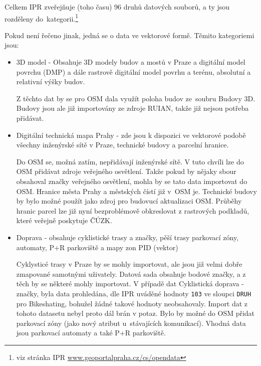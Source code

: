 Celkem IPR zveřejňuje (toho času) 96 druhů datových souborů, a ty jsou rozděleny
do~kategorii.\footnote{viz stránka IPR \url{www.geoportalpraha.cz/cs/opendata}}

Pokud není řečeno jinak, jedná se o data ve vektorové formě.
Těmito kategoriemi jsou:

\begin{itemize}
    \item   3D model - Obsahuje 3D modely budov a mostů v Praze a digitální
            model povrchu (DMP) a dále rastrově digitální model povrhu a
            terénu, absolutní a relativní výšky budov.

            Z těchto dat by se pro OSM dala využít poloha budov ze~soubru
            Budovy 3D. Budovy jsou ale již importovány ze zdroje RUIAN, takže
            již nejsou potřeba přidávat.

    \item   Digitální technická mapa Prahy - zde jsou k dispozici ve vektorové
            podobě všechny inženýrské sítě v Praze, technické budovy a parcelní hranice.

            Do OSM se, možná zatím, nepřidávají inženýrské sítě. V tuto chvíli
            lze do OSM přidávat zdroje veřejného osvětlení. Takže pokud by
            nějaky sbour obsahoval značky veřejného osvětlení, mohla by se tato
            data importovat do OSM. Hranice města Prahy a městských čístí již
            v~OSM je. Technické budovy by bylo možné použít jako zdroj
            pro budovucí aktualizaci OSM. Průběhy hranic parcel lze již nyní
            bezproblémově obkreslovat z rastrových podkladů, které veřejně
            poskytuje ČÚZK. 

    \item   Doprava - obsahuje cyklistické trasy a značky, pěší trasy
            parkovací zóny, automaty, P+R parkoviště a mapy zon PID (vektor)

            Cyklysticé trasy v Praze by se mohly importovat, ale jsou již velmi
            dobře zmapované samotnými uživately. Datová sada obsahuje bodové značky,
            a z těch by se některé mohly importovat.
            V případě dat Cyklistická doprava - značky, byla data prohledána, dle IPR
            uváděné hodnoty {\tt 103} ve sloupci {\tt DRUH} pro Bikeshating, bohužel
            žádné takové hodnoty neobsahovaly. Import dat z tohoto datasetu nebyl
            proto dál brán v potaz.
            Bylo by možné do OSM přidat parkovací zóny (jako nový atribut
            u~stávajících komunikací).
            Vhodná data jsou parkovací automaty a také P+R parkoviště.


\end{itemize}
